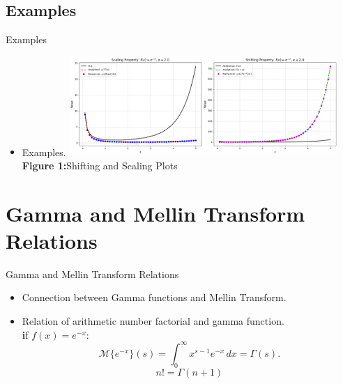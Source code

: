 \documentclass{beamer}
\begin{document}
\subsection{Examples}
\begin{frame}{Examples}
    \begin{itemize}
        \item Examples.
        \vfill %
        \centering
        \includegraphics[width=0.8\textwidth]{Shifting and scaling.png} %
        \\[0.2cm] %
        {\small \textbf {Figure 1:}Shifting and Scaling Plots} %
    \end{itemize}
\end{frame}

\section{Gamma and Mellin Transform Relations}
\begin{frame}{Gamma and Mellin Transform Relations}
    \begin{itemize}
        \item Connection between Gamma functions and Mellin Transform.
        \item Relation of arithmetic number factorial and gamma function.\\[0.2cm]
        {\small \textbf if \( f(x) = e^{-x} \):}
        \begin{equation}
            \mathcal{M}\{e^{-x}\}(s) = \int_{0}^{\infty} x^{s-1} e^{-x} \, dx = \Gamma(s).
        \end{equation}
        \begin{equation}
            n! = \Gamma(n+1)
        \end{equation}
    \end{itemize}
\end{frame}

\end{document}
